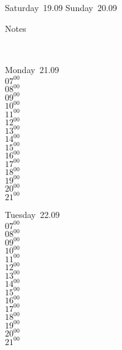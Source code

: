 \documentclass[11pt,a4paper]{book}\usepackage[]{graphicx}\usepackage[]{color}
\begin{document}
{{{{{{{{{{{{\begin{tcolorbox}
\end{tcolorbox} 
\begin{tcolorbox}[height=(\textheight-10mm)/6]
Saturday~19.09
\tcblower
Sunday~20.09
\end{tcolorbox} %
\begin{tcolorbox}[height=(\textheight-10mm)/6,sidebyside=false]
Notes
\end{tcolorbox}
\clearpage
\vspace{2 mm}\\
\begin{tcolorbox}
Monday~21.09\\
{ 
  $07^{00}$\\
$08^{00}$\\
$09^{00}$\\
$10^{00}$\\
$11^{00}$\\
$12^{00}$\\
$13^{00}$\\
$14^{00}$\\
$15^{00}$\\
$16^{00}$\\
$17^{00}$\\
$18^{00}$\\
$19^{00}$\\
$20^{00}$\\
$21^{00}$}\\

\end{tcolorbox}
\begin{tcolorbox}
Tuesday~22.09\\
{ 
  $07^{00}$\\
$08^{00}$\\
$09^{00}$\\
$10^{00}$\\
$11^{00}$\\
$12^{00}$\\
$13^{00}$\\
$14^{00}$\\
$15^{00}$\\
$16^{00}$\\
$17^{00}$\\
$18^{00}$\\
$19^{00}$\\
$20^{00}$\\
$21^{00}$}\\


\end{tcolorbox}}}}}}}}}}}}}
\end{document}

